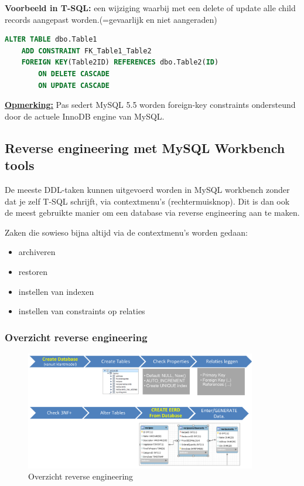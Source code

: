 \documentclass{article}
\newcommand{\bold}[1]{\textbf{#1}}
\begin{document}
\bold{Voorbeeld in T-SQL:} een wijziging waarbij met een delete of update alle child records aangepast worden.(=gevaarlijk en niet aangeraden)

\begin{lstlisting}[language=SQL]
ALTER TABLE dbo.Table1
    ADD CONSTRAINT FK_Table1_Table2
    FOREIGN KEY(Table2ID) REFERENCES dbo.Table2(ID)
        ON DELETE CASCADE
        ON UPDATE CASCADE
\end{lstlisting}

\bold{\underline{Opmerking:}} 
Pas sedert MySQL 5.5 worden foreign-key constraints ondersteund door de actuele InnoDB engine van MySQL. 


\subsection{Reverse engineering met MySQL Workbench tools}
De meeste DDL-taken kunnen uitgevoerd worden in MySQL workbench zonder dat je zelf T-SQL schrijft, via contextmenu's (rechtermuisknop).
Dit is dan ook de meest gebruikte manier om een database via reverse engineering aan te maken.

Zaken die sowieso bijna altijd via de contextmenu's worden gedaan:

\begin{itemize}
    \item archiveren
    \item restoren
    \item instellen van indexen
    \item instellen van constraints op relaties
\end{itemize}


\subsubsection{Overzicht reverse engineering}
\begin{figure}[H]
    \centering
    \includegraphics[width=0.9\textwidth]{overzicht-reverse-engineering.png}
    \caption{Overzicht reverse engineering}
\end{figure}
\end{document}
